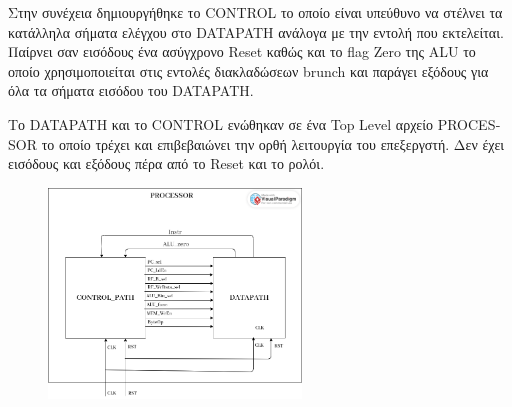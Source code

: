 \begin{justify}
    Στην συνέχεια δημιουργήθηκε το \textlatin{CONTROL} το οποίο
    είναι υπεύθυνο να στέλνει τα κατάλληλα σήματα ελέγχου στο
    \textlatin{DATAPATH} ανάλογα με την εντολή που εκτελείται.
    Παίρνει σαν εισόδους ένα ασύγχρονο \textlatin{Reset} καθώς και
    το \textlatin{flag Zero} της \textlatin{ALU} το οποίο
    χρησιμοποιείται στις εντολές διακλαδώσεων \textlatin{brunch}
    και παράγει εξόδους για όλα τα σήματα εισόδου του
    \textlatin{DATAPATH}.    
\end{justify}

\begin{justify}
    Το \textlatin{DATAPATH} και το \textlatin{CONTROL} ενώθηκαν
    σε ένα \textlatin{Top Level} αρχείο \textlatin{PROCESSOR}
    το οποίο τρέχει και επιβεβαιώνει την ορθή λειτουργία του επεξεργστή.
    Δεν έχει εισόδους και εξόδους πέρα από το \textlatin{Reset}
    και το ρολόι.
\end{justify}

\begin{figure}[h]
    \centering
    \includegraphics[width=0.6\textwidth]{Images/CDPATH.png} %
\end{figure}





